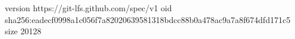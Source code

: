 version https://git-lfs.github.com/spec/v1
oid sha256:eadecf0998a1c056f7a82020639581318bdcc88b0a478ac9a7a8f674dfd171c5
size 20128
